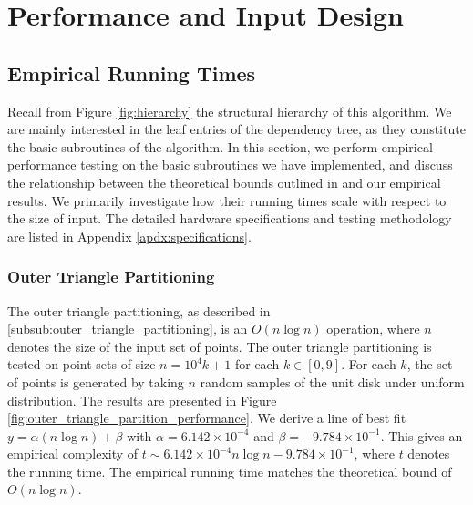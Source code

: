 \documentclass{article}
\newcommand{\figref}[1]{Figure \ref{#1}}
\newcommand{\apdxref}[1]{Appendix \ref{#1}}
\begin{document}
\section{Performance and Input Design}


\subsection{Empirical Running Times}

Recall from \figref{fig:hierarchy} the structural hierarchy of this algorithm. We are mainly interested in the leaf entries of the dependency tree, as they constitute the basic subroutines of the algorithm. In this section, we perform empirical performance testing on the basic subroutines we have implemented, and discuss the relationship between the theoretical bounds outlined in \cite{abb17} and our empirical results. We primarily investigate how their running times scale with respect to the size of input. The detailed hardware specifications and testing methodology are listed in \apdxref{apdx:specifications}.

\subsubsection{Outer Triangle Partitioning}

The outer triangle partitioning, as described in \ref{subsub:outer_triangle_partitioning}, is an $O(n \log n)$ operation, where $n$ denotes the size of the input set of points. The outer triangle partitioning is tested on point sets of size $n = 10^4 k + 1$ for each $k \in [0, 9]$. For each $k$, the set of points is generated by taking $n$ random samples of the unit disk under uniform distribution. The results are presented in \figref{fig:outer_triangle_partition_performance}. We derive a line of best fit $y = \alpha(n \log n) + \beta$ with $\alpha = 6.142 \times 10^{-4}$ and $\beta = -9.784 \times 10^{-1}$. This gives an empirical complexity of $t \sim 6.142 \times 10^{-4} n \log n -9.784 \times 10^{-1}$, where $t$ denotes the running time. The empirical running time matches the theoretical bound of $O(n \log n)$.
\end{document}
